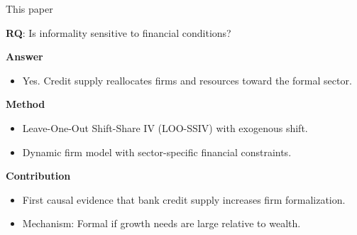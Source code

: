 \documentclass[aspectratio=169]{beamer}
\begin{document}
\begin{frame}{This paper} \label{this_paper}
 
\begin{center}
    \Large \textbf{RQ}: Is informality sensitive to financial conditions?
\end{center}
 
\vspace{2mm}
\pause
 
\textbf{Answer}
\begin{itemize}
    \item Yes. Credit supply reallocates firms and resources toward the formal sector.
\end{itemize}
 
\vspace{2mm}
\pause
 
\textbf{Method}
\begin{itemize}
    \item Leave-One-Out Shift-Share IV (LOO-SSIV) with exogenous shift.
    \item Dynamic firm model with sector-specific financial constraints.
\end{itemize}
 
\vspace{2mm}
\pause
 
\textbf{Contribution}
\begin{itemize}
    \item First causal evidence that bank credit supply increases firm formalization.
    \item Mechanism: Formal if growth needs are large relative to wealth.
\end{itemize}

\vspace{10mm}

\hyperlink{literature}{} 
 
\end{frame}
 
 
\end{document}
